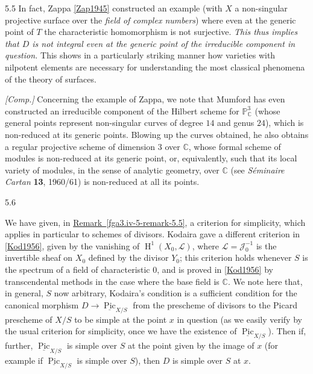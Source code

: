 \begin{remark}{5.5}
    In fact, Zappa \hyperref[Zap1945]{[Zap1945]} constructed an example (with \(X\) a non-singular projective surface over the \emph{field of complex numbers}) where even at the generic point of \(T\) the characteristic homomorphism is not surjective.
    \emph{This thus implies that \(D\) is not integral even at the generic point of the irreducible component in question.}
    This shows in a particularly striking manner how varieties with nilpotent elements are necessary for understanding the most classical phenomena of the theory of surfaces.\par{}\emph{[Comp.]}
    Concerning the example of Zappa, we note that Mumford has even constructed an irreducible component of the Hilbert scheme for \(\mathbb {P}_\mathbb {C}^3\) (whose general points represent non-singular curves of degree \(14\) and genus \(24\)), which is non-reduced at its generic points.
    Blowing up the curves obtained, he also obtains a regular projective scheme of dimension \(3\) over \(\mathbb {C}\), whose formal scheme of modules is non-reduced at its generic point, or, equivalently, such that its local variety of modules, in the sense of analytic geometry, over \(\mathbb {C}\) (see \emph{Séminaire Cartan} \textbf{13}, 1960/61) is non-reduced at all its points.\end{remark}\begin{remark}{5.6}\label{fga3.iv-5-remark-5.6}\skipsinglepar\par{}We have given, in \hyperref[fga3.iv-5-remark-5.5]{Remark~\ref*{fga3.iv-5-remark-5.5}}, a criterion for simplicity, which applies in particular to schemes of divisors.
    Kodaira gave a different criterion in \hyperref[Kod1956]{[Kod1956]}, given by the vanishing of \(\operatorname {H}^1(X_0,\mathscr {L})\), where \(\mathscr {L}=\mathscr {J}_0^{-1}\) is the invertible sheaf on \(X_0\) defined by the divisor \(Y_0\);
    this criterion holds whenever \(S\) is the spectrum of a field of characteristic \(0\), and is proved in \hyperref[Kod1956]{[Kod1956]} by transcendental methods in the case where the base field is \(\mathbb {C}\).
    We note here that, in general, \(S\) now arbitrary, Kodaira's condition is a sufficient condition for the canonical morphism \(D\to \underline {\operatorname {Pic}}_{X/S}\) from the prescheme of divisors to the Picard prescheme of \(X/S\) to be simple at the point \(x\) in question (as we easily verify by the usual criterion for simplicity, once we have the existence of \(\underline {\operatorname {Pic}}_{X/S}\)).
    Then if, further, \(\underline {\operatorname {Pic}}_{X/S}\) is simple over \(S\) at the point given by the image of \(x\) (for example if \(\underline {\operatorname {Pic}}_{X/S}\) is simple over \(S\)), then \(D\) is simple over \(S\) at \(x\).

\end{remark}
